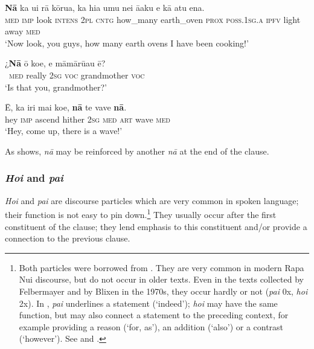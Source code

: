 \ea\label{ex:4.158}
\gll \textbf{Nā} ka u{\ꞌ}i rā kōrua, ka hia {\ꞌ}umu nei {\ꞌ}ā{\ꞌ}aku  e kā atu ena.\\
\textsc{med} \textsc{imp} look \textsc{intens} \textsc{2pl} \textsc{cntg} how\_many earth\_oven \textsc{prox} \textsc{poss.1sg.a}  \textsc{ipfv} light away \textsc{med}\\

\glt 
‘Now look, you guys, how many earth ovens I have been cooking!’ \textstyleExampleref{[R352.089]} 
\z

\ea\label{ex:4.159}
\gll ¿\textbf{Nā} {\ꞌ}ō koe, e māmārū{\ꞌ}au ē?\\
~\textsc{med} really \textsc{2sg} \textsc{voc} grandmother \textsc{voc}\\

\glt 
‘Is that you, grandmother?’ \textstyleExampleref{[R313.119]} 
\z

\ea\label{ex:4.160}
\gll {\ꞌ}Ē, ka iri mai koe, \textbf{nā} te vave \textbf{nā}. \\
hey \textsc{imp} ascend hither \textsc{2sg} \textsc{med} \textsc{art} wave \textsc{med} \\

\glt
‘Hey, come up, there is a wave!’ \textstyleExampleref{[R126.025]} 
\z

As  shows, \textit{nā} may be reinforced by another \textit{nā} at the end of the clause.
\subsubsection{\textit{Ho{\ꞌ}i} and \textit{pa{\ꞌ}i}}\label{sec:4.5.4.2}

\textit{Ho{\ꞌ}i} and \textit{pa{\ꞌ}i} are discourse particles which are very common in spoken language; their function is not easy to pin down.\footnote{\label{fn:203}Both particles were borrowed from . They are very common in modern Rapa Nui discourse, but do not occur in older texts. Even in the texts collected by Felbermayer and by Blixen in the 1970s, they occur hardly or not (\textit{pa{\ꞌ}i} 0x, \textit{ho{\ꞌ}i} 2x). In , \textit{pa{\ꞌ}i} underlines a statement (‘indeed’); \textit{ho{\ꞌ}i} may have the same function, but may also connect a statement to the preceding context, for example providing a reason (‘for, as’), an addition (‘also’) or a contrast (‘however’). See \citet[381]{AcadémieTahitienne1986} and \citet[117]{LazardPeltzer2000}.} They usually occur after the first constituent of the clause; they lend emphasis to this constituent and/or provide a connection to the previous clause. 
